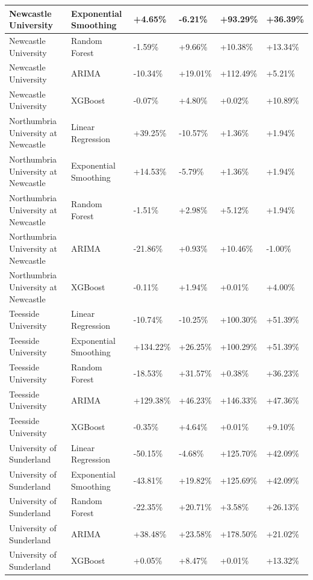 \documentclass[journal,onecolumn, 10pt,draftclsnofoot]{IEEEtran}
\begin{document}
\begin{table}[h]
{\begin{tabular}{|l|l|l|l|l|l|}
\hline Newcastle University & Exponential Smoothing & +4.65\% & -6.21\% & +93.29\% & +36.39\% \\
\hline Newcastle University & Random Forest & -1.59\% & +9.66\% & +10.38\% & +13.34\% \\
\hline Newcastle University & ARIMA & -10.34\% & +19.01\% & +112.49\% & +5.21\% \\
\hline Newcastle University & XGBoost & -0.07\% & +4.80\% & +0.02\% & +10.89\% \\
\hline Northumbria University at Newcastle & Linear Regression & +39.25\% & -10.57\% & +1.36\% & +1.94\% \\
\hline Northumbria University at Newcastle & Exponential Smoothing & +14.53\% & -5.79\% & +1.36\% & +1.94\% \\
\hline Northumbria University at Newcastle & Random Forest & -1.51\% & +2.98\% & +5.12\% & +1.94\% \\
\hline Northumbria University at Newcastle & ARIMA & -21.86\% & +0.93\% & +10.46\% & -1.00\% \\
\hline Northumbria University at Newcastle & XGBoost & -0.11\% & +1.94\% & +0.01\% & +4.00\% \\
\hline Teesside University & Linear Regression & -10.74\% & -10.25\% & +100.30\% & +51.39\% \\
\hline Teesside University & Exponential Smoothing & +134.22\% & +26.25\% & +100.29\% & +51.39\% \\
\hline Teesside University & Random Forest & -18.53\% & +31.57\% & +0.38\% & +36.23\% \\
\hline Teesside University & ARIMA & +129.38\% & +46.23\% & +146.33\% & +47.36\% \\
\hline Teesside University & XGBoost & -0.35\% & +4.64\% & +0.01\% & +9.10\% \\
\hline University of Sunderland & Linear Regression & -50.15\% & -4.68\% & +125.70\% & +42.09\% \\
\hline University of Sunderland & Exponential Smoothing & -43.81\% & +19.82\% & +125.69\% & +42.09\% \\
\hline University of Sunderland & Random Forest & -22.35\% & +20.71\% & +3.58\% & +26.13\% \\
\hline University of Sunderland & ARIMA & +38.48\% & +23.58\% & +178.50\% & +21.02\% \\
\hline University of Sunderland & XGBoost & +0.05\% & +8.47\% & +0.01\% & +13.32\% \\
\hline
\end{tabular}
}
\label{tab:forecasted-trends}
\end{table}
\end{document}

